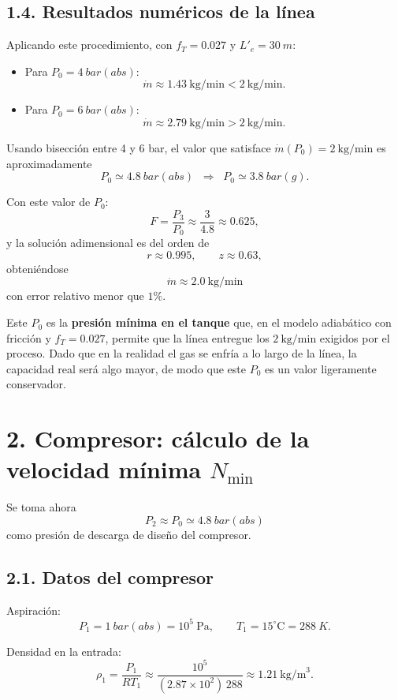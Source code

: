 \documentclass[11pt,a4paper]{article}
\begin{document}
\subsection*{1.4. Resultados numéricos de la línea}

Aplicando este procedimiento, con $f_T = 0.027$ y $L'_e = \SI{30}{m}$:

\begin{itemize}
  \item Para $P_0 = \SI{4}{bar(abs)}$:
  \[
  \dot m \approx 1.43\ \mathrm{kg/min} < 2\ \mathrm{kg/min}.
  \]
  \item Para $P_0 = \SI{6}{bar(abs)}$:
  \[
  \dot m \approx 2.79\ \mathrm{kg/min} > 2\ \mathrm{kg/min}.
  \]
\end{itemize}

Usando bisección entre 4 y 6 bar, el valor que satisface
$\dot m(P_0) = 2\ \mathrm{kg/min}$ es aproximadamente
\[
\boxed{P_0 \simeq \SI{4.8}{bar(abs)} \;\;\Rightarrow\;\; P_0 \simeq \SI{3.8}{bar(g)}.}
\]

Con este valor de $P_0$:
\[
F = \frac{P_3}{P_0} \approx \frac{3}{4.8} \approx 0.625,
\]
y la solución adimensional es del orden de
\[
r \approx 0.995,\qquad z \approx 0.63,
\]
obteniéndose
\[
\dot m \approx 2.0\ \mathrm{kg/min}
\]
con error relativo menor que $1\%$.

Este $P_0$ es la \textbf{presión mínima en el tanque} que, en el modelo adiabático con fricción y $f_T = 0.027$, permite que la línea entregue los $2\ \mathrm{kg/min}$ exigidos por el proceso. Dado que en la realidad el gas se enfría a lo largo de la línea, la capacidad real será algo mayor, de modo que este $P_0$ es un valor ligeramente conservador.

\section*{2. Compresor: cálculo de la velocidad mínima $N_{\min}$}

Se toma ahora
\[
P_2 \approx P_0 \simeq \SI{4.8}{bar(abs)}
\]
como presión de descarga de diseño del compresor.

\subsection*{2.1. Datos del compresor}

Aspiración:
\[
P_1 = \SI{1}{bar(abs)} = 10^5\ \mathrm{Pa},\qquad
T_1 = 15^\circ\mathrm{C} = \SI{288}{K}.
\]

Densidad en la entrada:
\[
\rho_1 = \frac{P_1}{R T_1}
       \approx \frac{10^5}{(2.87\times10^2)\,288}
       \approx 1.21\ \mathrm{kg/m}^3.
\]
\end{document}
